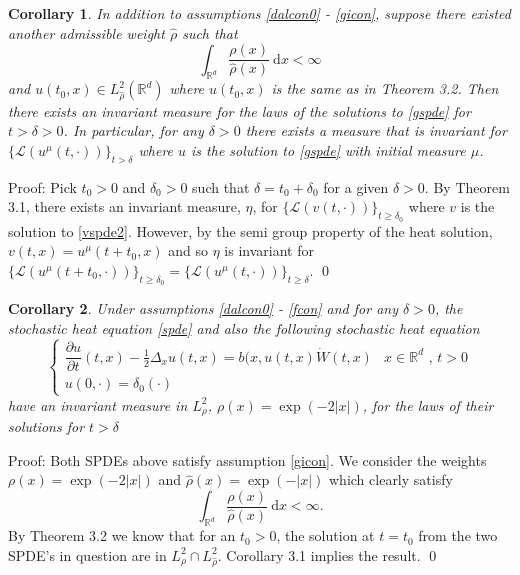 \documentclass{article}
\newtheorem{corollary}{Corollary}[section]
\numberwithin{equation}{section}
\newcommand{\R}{\mathbb{R}}
\newcommand{\ud}{\ensuremath{\mathrm{d}}}
\begin{document}
\begin{corollary} \textit{In addition to assumptions \ref{dalcon0} - \ref{gicon}, suppose there existed another admissible weight $\hat{\rho}$ such that $$ \int_{\R^d}\dfrac{\rho(x)}{\hat\rho(x)}\: \ud x < \infty $$ and $u(t_0,x) \in L^2_{\hat\rho}(\R^d)$ where $u(t_0,x)$ is the same as in Theorem 3.2. Then there exists an invariant measure for the laws of the solutions to \eqref{gspde} for $t>\delta>0$. In particular, for any $\delta>0$ there exists a measure that is invariant for $\{\mathscr L (u^\mu(t,\cdot))\}_{t>\delta}$ where $u$ is the solution to \eqref{gspde} with initial measure $\mu$.} 
\end{corollary}

Proof: Pick $t_0>0$ and $\delta_0>0$ such that $\delta=t_0+\delta_0$ for a given $\delta >0$.  By Theorem 3.1, there exists an invariant measure, $\eta$, for $\{\mathscr L(v(t,\cdot))\}_{t\ge \delta_0}$ where $v$ is the solution to \eqref{vspde2}. However, by the semi group property of the heat solution, $v(t,x)=u^\mu(t+t_0,x)$ and so $\eta$ is invariant for $\{\mathscr L(u^\mu(t+t_0,\cdot))\}_{t\ge \delta_0} = \{\mathscr L(u^\mu(t,\cdot))\}_{t\ge \delta}$. \qed\\

\begin{corollary} \textit{Under assumptions \ref{dalcon0} - \ref{fcon} and for any $\delta>0$, the stochastic heat equation \eqref{spde} and also the following stochastic heat equation 
\begin{equation}
\begin{cases}
\dfrac{\partial u}{\partial t}(t,x)-\frac{1}{2}\Delta_x u(t,x) = b(x,u(t,x)\dot W(t,x) & \text{$x\in \mathbb R^d$ , $t>0$}
\\ u(0,\cdot) = \delta_0(\cdot)  & 
\end{cases}  \label{dspde}
\end{equation}
have an invariant measure in $L^2_\rho$, $\rho(x)=\exp(-2|x|)$, for the laws of their solutions for $t>\delta$} 
\end{corollary}

Proof: Both SPDEs above satisfy assumption \ref{gicon}. We consider the weights $\rho(x)=\exp(-2|x|)$ and $\hat{\rho}(x)=\exp(-|x|)$ which clearly satisfy $$\int_{\R^d}\dfrac{\rho(x)}{\hat\rho(x)}\: \ud x < \infty.$$ By Theorem 3.2 we know that for an $t_0>0$, the solution at $t=t_0$ from the two SPDE's in question are in $L^2_\rho \cap L^2_{\hat\rho}$. Corollary 3.1 implies the result. \qed\\
\end{document}
